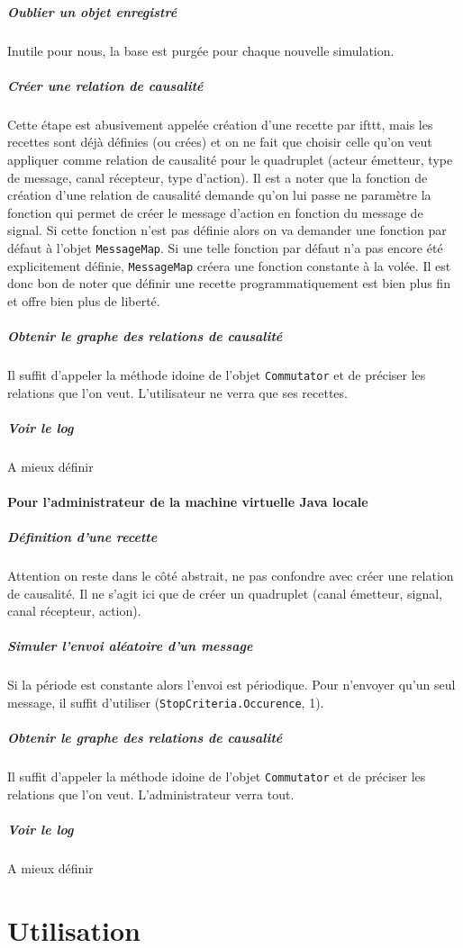 \documentclass[11pt]{article}
\begin{document}
\subparagraph{Oublier un objet enregistré} Inutile pour nous, la base est purgée pour chaque nouvelle simulation.

\subparagraph{Créer une relation de causalité} Cette étape est abusivement appelée création d'une recette par ifttt, mais les recettes sont déjà définies (ou crées) et on ne fait que choisir celle qu'on veut appliquer comme relation de causalité pour le quadruplet (acteur émetteur, type de message, canal récepteur, type d'action). Il est a noter que la fonction de création d'une relation de causalité demande qu'on lui passe ne paramètre la fonction qui permet de créer le message d'action en fonction du message de signal. Si cette fonction n'est pas définie alors on va demander une fonction par défaut à l'objet \texttt{MessageMap}. Si une telle fonction par défaut n'a pas encore été explicitement définie, \texttt{MessageMap} créera une fonction constante à la volée. Il est donc bon de noter que définir une recette programmatiquement est bien plus fin et offre bien plus de liberté.

\subparagraph{Obtenir le graphe des relations de causalité} Il suffit d'appeler la méthode idoine de l'objet \texttt{Commutator} et de préciser les relations que l'on veut. L'utilisateur ne verra que ses recettes.

\subparagraph{Voir le log} A mieux définir

\paragraph{Pour l'administrateur de la machine virtuelle Java locale}

\subparagraph{Définition d'une recette} Attention on reste dans le côté abstrait, ne pas confondre avec créer une relation de causalité. Il ne s'agit ici que de créer un quadruplet (canal émetteur, signal, canal récepteur, action).

\subparagraph{Simuler l'envoi aléatoire d'un message} Si la période est constante alors l'envoi est périodique. Pour n'envoyer qu'un seul message, il suffit d'utiliser (\texttt{StopCriteria.Occurence}, 1).

\subparagraph{Obtenir le graphe des relations de causalité} Il suffit d'appeler la méthode idoine de l'objet \texttt{Commutator} et de préciser les relations que l'on veut. L'administrateur verra tout.

\subparagraph{Voir le log} A mieux définir

\section{Utilisation}
\end{document}
